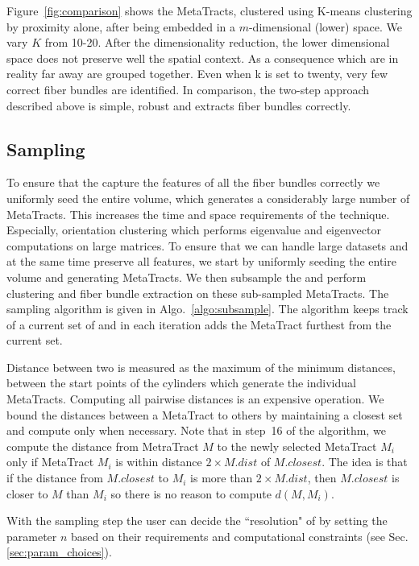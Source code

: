 Figure~\ref{fig:comparison} shows the MetaTracts, clustered using K-means clustering by proximity alone, after being embedded in a $m$-dimensional (lower) space. We vary $K$ from 10-20. After the dimensionality reduction, the lower dimensional space does not preserve well the spatial context. As a consequence \mt which are in reality far away are grouped together. Even when k is set to twenty, very few correct fiber bundles are identified.  In comparison, the two-step approach described above is simple, robust and extracts fiber bundles correctly.
\subsection {Sampling \mt}\label{subsec:sampling_mt}
To ensure that the \mt capture the features of all the fiber bundles correctly we uniformly seed the entire volume, which generates a considerably large number of MetaTracts. This increases the time and space requirements of the technique. Especially, orientation clustering which performs eigenvalue and eigenvector computations on large matrices. To ensure that we can handle large datasets and at the same time preserve all features, we start by uniformly seeding the entire volume and generating MetaTracts. We then subsample the \mt and  perform clustering and fiber bundle extraction on these sub-sampled MetaTracts.
The sampling algorithm is given in Algo.~\ref{algo:subsample}. The algorithm  keeps track of a current set of \mt and in each iteration adds the MetaTract furthest from the current set.

Distance between two \mt is measured as the maximum of the minimum distances, between the start points of the cylinders which generate the individual MetaTracts. 
Computing all pairwise distances is an expensive operation. We bound the distances between a MetaTract to others by maintaining a closest set and compute only when necessary.
Note that in step~16 of the algorithm,
we compute the distance from MetraTract $M$
to the newly selected MetaTract $M_i$
only if MetaTract $M_i$ is within distance $2 \times M.dist$ of $M.closest$.
The idea is that if the distance from $M.closest$ to $M_i$ 
is more than $2 \times M.dist$, then $M.closest$ is closer to $M$
than $M_i$ so there is no reason to compute $d(M,M_i)$.

With the sampling step the user can decide the ``resolution" of \mt by setting the parameter $n$ based on their requirements and computational constraints (see Sec.\ref{sec:param_choices}).

